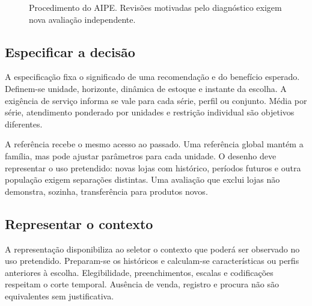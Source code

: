 \begin{figure}[htbp]\centering
{}
\caption{Procedimento do AIPE. Revisões motivadas pelo diagnóstico exigem nova avaliação independente.}\label{fig:aipe_procedimento}
\end{figure}

\subsection{Especificar a decisão}
A especificação fixa o significado de uma recomendação e do benefício esperado. Definem-se unidade, horizonte, dinâmica de estoque e instante da escolha. A exigência de serviço informa se vale para cada série, perfil ou conjunto. Média por série, atendimento ponderado por unidades e restrição individual são objetivos diferentes.

A referência recebe o mesmo acesso ao passado. Uma referência global mantém a família, mas pode ajustar parâmetros para cada unidade. O desenho deve representar o uso pretendido: novas lojas com histórico, períodos futuros e outra população exigem separações distintas. Uma avaliação que exclui lojas não demonstra, sozinha, transferência para produtos novos.

\subsection{Representar o contexto}
A representação disponibiliza ao seletor o contexto que poderá ser observado no uso pretendido. Preparam-se os históricos e calculam-se características ou perfis anteriores à escolha. Elegibilidade, preenchimentos, escalas e codificações respeitam o corte temporal. Ausência de venda, registro e procura não são equivalentes sem justificativa.

